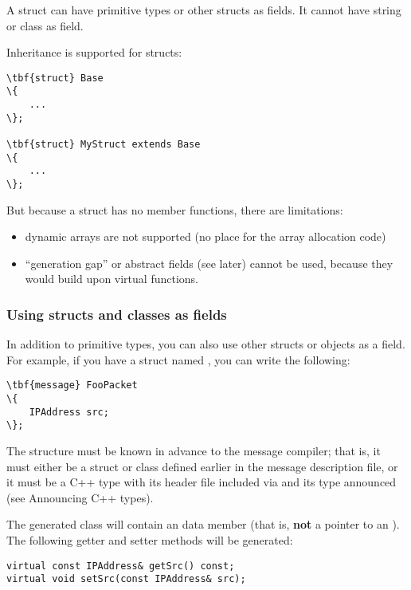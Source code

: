 A struct can have primitive types or other structs as fields. It cannot
have string or class as field.

Inheritance is supported for structs:

\begin{Verbatim}[commandchars=\\\{\}]
\tbf{struct} Base
\{
    ...
\};

\tbf{struct} MyStruct extends Base
\{
    ...
\};
\end{Verbatim}

But because a struct has no member functions, there are limitations:

\begin{itemize}
   \item dynamic arrays are not supported (no place for the array allocation code)
   \item ``generation gap'' or abstract fields (see later) cannot be used,
      because they would build upon virtual functions.
\end{itemize}


\subsubsection{Using structs and classes as fields}

In addition to primitive types, you can also use other structs or objects
as a field. For example, if you have a struct named ,
you can write the following:

\begin{Verbatim}[commandchars=\\\{\}]
\tbf{message} FooPacket
\{
    IPAddress src;
\};
\end{Verbatim}

The  structure must be known in advance to the message compiler;
that is, it must either be a struct or class defined earlier in the message
description file, or it must be a C++ type with its header file
included via  and its type announced
(see Announcing C++ types).

The generated class will contain an  data member
(that is, \textbf{not} a pointer to an ).
The following getter and setter methods will be generated:

\begin{verbatim}
virtual const IPAddress& getSrc() const;
virtual void setSrc(const IPAddress& src);
\end{verbatim}


